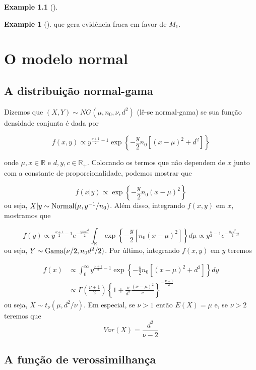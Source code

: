 \documentclass[
  letterpaper,
  DIV=11,
  numbers=noendperiod]{scrreprt}
\theoremstyle{definition}
\theoremstyle{plain}
\theoremstyle{definition}
\newtheorem{example}{Example}[chapter]
\theoremstyle{remark}
\begin{document}
\begin{example}[]
\begin{example}[]
que gera evidência fraca em favor de \(M_1\).

\end{example}


\chapter{O modelo normal}\label{o-modelo-normal}

\section{A distribuição
normal-gama}\label{a-distribuiuxe7uxe3o-normal-gama}

Dizemos que \((X,Y)\sim NG(\mu,n_0,\nu,d^2)\) (lê-se normal-gama) se sua
função densidade conjunta é dada por

\[f(x,y)\propto y^{\frac{\nu+1}{2}-1}\exp\left\{-\frac{y}{2}n_0\left[(x-\mu)^2 + d^2\right]\right\}\]

onde \(\mu,x\in\mathbb{R}\) e \(d,y,c\in\mathbb{R}_+\). Colocando os
termos que não dependem de \(x\) junto com a constante de
proporcionalidade, podemos mostrar que

\[f(x|y)\propto \exp\left\{-\frac{y}{2}n_0(x-\mu)^2\right\}\] ou seja,
\(X|y\sim\hbox{Normal}(\mu,y^{-1}/n_0)\). Além disso, integrando
\(f(x,y)\) em \(x\), mostramos que

\[f(y)\propto y^{\frac{\nu+1}{2}-1}e^{-\frac{yn_0d^2}{2}}\int_{\mathbb{R}}\exp\left\{-\frac{y}{2}\left[n_0(x-\mu)^2\right]\right\}d\mu\propto y^{\frac{\nu}{2}-1}e^{-\frac{n_0d^2}{2}y}\]
ou seja, \(Y\sim\hbox{Gama}(\nu/2, n_0d^2/2)\). Por último, integrando
\(f(x,y)\) em \(y\) teremos

\[\begin{align}f(x)&\propto \int_0^\infty y^{\frac{\nu+1}{2}-1}\exp\left\{-\frac{y}{2}n_0\left[(x-\mu)^2 + d^2\right]\right\}dy \\&\propto \Gamma\left(\frac{\nu+1}{2}\right)\left\{1+\frac{\nu}{d^2}\frac{(x-\mu)^2}{\nu}\right\}^{-\frac{\nu+1}{2}}\end{align}\]
ou seja, \(X\sim t_{\nu}(\mu, d^2/\nu)\). Em especial, se \(\nu>1\)
então \(E(X)=\mu\) e, se \(\nu>2\) teremos que
\[Var(X)=\frac{d^2}{\nu-2}\]

\section{A função de
verossimilhança}\label{a-funuxe7uxe3o-de-verossimilhanuxe7a-1}


\end{example}
\end{document}
